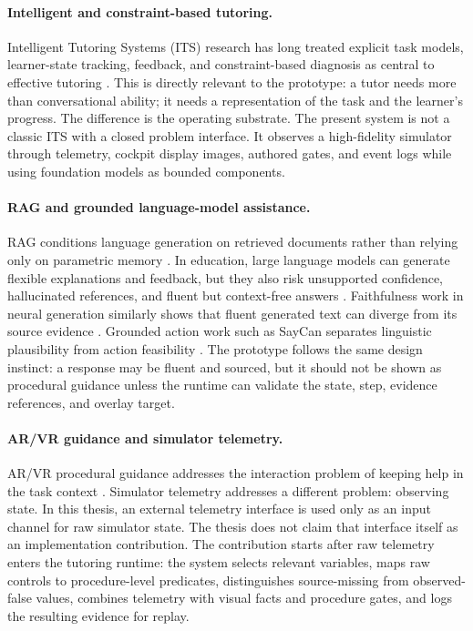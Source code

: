 \paragraph{Intelligent and constraint-based tutoring.}
Intelligent Tutoring Systems (ITS) research has long treated explicit task
models, learner-state tracking, feedback, and constraint-based diagnosis as
central to effective tutoring
\citep{vanlehn2011relative,kulik2016its,mitrovic2012constraint,aleven2009example}.
This is directly relevant to the prototype: a tutor needs more than conversational
ability; it needs a representation of the task and the learner's progress. The
difference is the operating substrate. The present system is not a classic ITS
with a closed problem interface. It observes a high-fidelity simulator through
telemetry, cockpit display images, authored gates, and event logs while using
foundation models as bounded components.

\paragraph{RAG and grounded language-model assistance.}
RAG conditions language generation on retrieved documents rather than relying
only on parametric memory \citep{lewis2020rag}. In education, large language
models can generate flexible explanations and feedback, but they also risk
unsupported confidence, hallucinated references, and fluent but context-free
answers \citep{kasneci2023chatgpt,ji2023hallucination}. Faithfulness work in
neural generation similarly shows that fluent generated text can diverge from
its source evidence \citep{maynez2020faithfulness}. Grounded action work such
as SayCan separates linguistic plausibility from action feasibility
\citep{ahn2022saycan}. The prototype follows the same design instinct: a response
may be fluent and sourced, but it should not be shown as procedural guidance
unless the runtime can validate the state, step, evidence references, and
overlay target.

\paragraph{AR/VR guidance and simulator telemetry.}
AR/VR procedural guidance addresses the interaction problem of keeping help in
the task context \citep{palmarini2018ar}. Simulator telemetry addresses a
different problem: observing state. In this thesis, an external telemetry
interface is used only as an input channel for raw simulator state. The thesis
does not claim that interface itself as an implementation contribution. The
contribution starts after raw telemetry enters the tutoring runtime: the system
selects relevant variables, maps raw controls to procedure-level predicates,
distinguishes source-missing from observed-false values, combines telemetry
with visual facts and procedure gates, and logs the resulting evidence for
replay.

